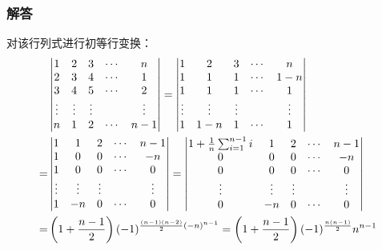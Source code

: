 \documentclass[10pt,xcolor=svgnames]{beamer} %
\begin{document}
\begin{frame}
    \frametitle{解答}
    对该行列式进行初等行变换：
    \begin{align*}
          &
        \begin{vmatrix}
            1      & 2      & 3      & \cdots & n      \\
            2      & 3      & 4      & \cdots & 1      \\
            3      & 4      & 5      & \cdots & 2      \\
            \vdots & \vdots & \vdots &        & \vdots \\
            n      & 1      & 2      & \cdots & n-1
        \end{vmatrix}=
        \begin{vmatrix}
            1      & 2      & 3      & \cdots & n      \\
            1      & 1      & 1      & \cdots & 1-n    \\
            1      & 1      & 1      & \cdots & 1      \\
            \vdots & \vdots & \vdots &        & \vdots \\
            1      & 1-n    & 1      & \cdots & 1
        \end{vmatrix}                                                                           \\
        = &
        \begin{vmatrix}
            1      & 1      & 2      & \cdots & n-1    \\
            1      & 0      & 0      & \cdots & -n     \\
            1      & 0      & 0      & \cdots & 0      \\
            \vdots & \vdots & \vdots &        & \vdots \\
            1      & -n     & 0      & \cdots & 0
        \end{vmatrix}=
        \begin{vmatrix}
            1+\frac{1}{n}\sum_{i=1}^{n-1}i & 1      & 2      & \cdots & n-1    \\
            0                              & 0      & 0      & \cdots & -n     \\
            0                              & 0      & 0      & \cdots & 0      \\
            \vdots                         & \vdots & \vdots &        & \vdots \\
            0                              & -n     & 0      & \cdots & 0
        \end{vmatrix}                                                   \\
        = & \left( 1+\frac{n-1}{2} \right)(-1)^{\frac{(n-1)(n-2)}{2}(-n)^{n-1}}=\left( 1+\frac{n-1}{2} \right)(-1)^{\frac{n(n-1)}{2}}n^{n-1}
    \end{align*}
\end{frame}
\end{document}
